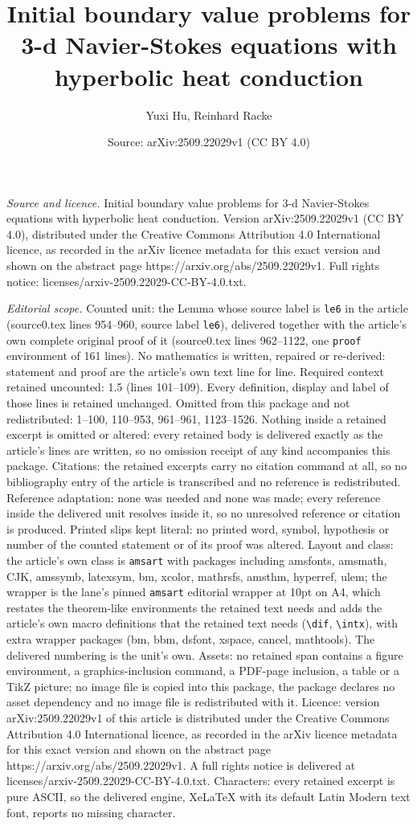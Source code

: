 \documentclass[10pt,a4paper]{amsart}
\title[Initial boundary value problems for 3-d Navier-Stokes equati]{Initial boundary value problems for 3-d Navier-Stokes equations with hyperbolic heat conduction}
\author{Yuxi Hu, Reinhard Racke}
\date{Source: arXiv:2509.22029v1 (CC BY 4.0)}
\begin{document}
\maketitle

\noindent\emph{Source and licence.} Initial boundary value problems for 3-d Navier-Stokes equations with hyperbolic heat conduction. Version arXiv:2509.22029v1 (CC BY 4.0), distributed under the Creative Commons Attribution 4.0 International licence, as recorded in the arXiv licence metadata for this exact version and shown on the abstract page https://arxiv.org/abs/2509.22029v1. Full rights notice: licenses/arxiv-2509.22029-CC-BY-4.0.txt.\par\smallskip

\noindent\textit{Editorial scope.} Counted unit: the Lemma whose source label is \texttt{le6} in the article (source0.tex lines 954--960, source label \texttt{le6}), delivered together with the article's own complete original proof of it (source0.tex lines 962--1122, one \texttt{proof} environment of 161 lines). No mathematics is written, repaired or re-derived: statement and proof are the article's own text line for line. Required context retained uncounted: 1.5 (lines 101--109). Every definition, display and label of those lines is retained unchanged. Omitted from this package and not redistributed: 1--100, 110--953, 961--961, 1123--1526. Nothing inside a retained excerpt is omitted or altered: every retained body is delivered exactly as the article's lines are written, so no omission receipt of any kind accompanies this package. Citations: the retained excerpts carry no citation command at all, so no bibliography entry of the article is transcribed and no reference is redistributed. Reference adaptation: none was needed and none was made; every reference inside the delivered unit resolves inside it, so no unresolved reference or citation is produced. Printed slips kept literal: no printed word, symbol, hypothesis or number of the counted statement or of its proof was altered. Layout and class: the article's own class is \texttt{amsart} with packages including amsfonts, amsmath, CJK, amssymb, latexsym, bm, xcolor, mathrsfs, amsthm, hyperref, ulem; the wrapper is the lane's pinned \texttt{amsart} editorial wrapper at 10pt on A4, which restates the theorem-like environments the retained text needs and adds the article's own macro definitions that the retained text needs (\texttt{\textbackslash dif}, \texttt{\textbackslash intx}), with extra wrapper packages (bm, bbm, dsfont, xspace, cancel, mathtools). The delivered numbering is the unit's own. Assets: no retained span contains a figure environment, a graphics-inclusion command, a PDF-page inclusion, a table or a TikZ picture; no image file is copied into this package, the package declares no asset dependency and no image file is redistributed with it. Licence: version arXiv:2509.22029v1 of this article is distributed under the Creative Commons Attribution 4.0 International licence, as recorded in the arXiv licence metadata for this exact version and shown on the abstract page https://arxiv.org/abs/2509.22029v1. A full rights notice is delivered at licenses/arxiv-2509.22029-CC-BY-4.0.txt. Characters: every retained excerpt is pure ASCII, so the delivered engine, XeLaTeX with its default Latin Modern text font, reports no missing character.
\end{document}
